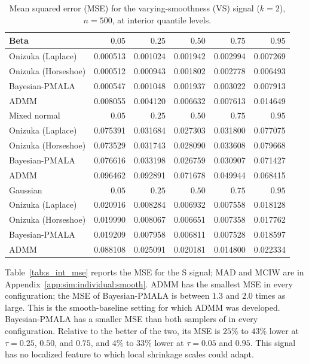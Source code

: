 \begin{table}[!htbp]
\centering
\small
\caption{Mean squared error (MSE) for the varying-smoothness (VS) signal ($k=2$), $n=500$, at interior quantile levels.}
\label{tab:vs_int_mse}
\begin{tabular}{lrrrrr}
\toprule
Beta & $0.05$ & $0.25$ & $0.50$ & $0.75$ & $0.95$ \\
\midrule
Onizuka (Laplace) & 0.000513 & 0.001024 & 0.001942 & 0.002994 & 0.007269 \\
Onizuka (Horseshoe) & 0.000512 & 0.000943 & 0.001802 & 0.002778 & 0.006493 \\
Bayesian-PMALA & 0.000547 & 0.001048 & 0.001937 & 0.003022 & 0.007913 \\
ADMM & 0.008055 & 0.004120 & 0.006632 & 0.007613 & 0.014649 \\
\midrule
Mixed normal & $0.05$ & $0.25$ & $0.50$ & $0.75$ & $0.95$ \\
\midrule
Onizuka (Laplace) & 0.075391 & 0.031684 & 0.027303 & 0.031800 & 0.077075 \\
Onizuka (Horseshoe) & 0.073529 & 0.031743 & 0.028090 & 0.033608 & 0.079668 \\
Bayesian-PMALA & 0.076616 & 0.033198 & 0.026759 & 0.030907 & 0.071427 \\
ADMM & 0.096462 & 0.092891 & 0.071678 & 0.049944 & 0.068415 \\
\midrule
Gaussian & $0.05$ & $0.25$ & $0.50$ & $0.75$ & $0.95$ \\
\midrule
Onizuka (Laplace) & 0.020916 & 0.008284 & 0.006932 & 0.007558 & 0.018128 \\
Onizuka (Horseshoe) & 0.019990 & 0.008067 & 0.006651 & 0.007358 & 0.017762 \\
Bayesian-PMALA & 0.019209 & 0.007958 & 0.006811 & 0.007528 & 0.018597 \\
ADMM & 0.088108 & 0.025091 & 0.020181 & 0.014800 & 0.022334 \\
\bottomrule
\end{tabular}
\end{table}

Table~\ref{tab:s_int_mse} reports the MSE for the S signal; MAD and MCIW are in Appendix~\ref{app:sim:individual:smooth}. ADMM has the smallest MSE in every configuration; the MSE of Bayesian-PMALA is between $1.3$ and $2.0$ times as large. This is the smooth-baseline setting for which ADMM was developed. Bayesian-PMALA has a smaller MSE than both samplers of \citet{onizuka2024fast} in every configuration. Relative to the better of the two, its MSE is $25\%$ to $43\%$ lower at $\tau=0.25$, $0.50$, and $0.75$, and $4\%$ to $33\%$ lower at $\tau=0.05$ and $0.95$. This signal has no localized feature to which local shrinkage scales could adapt.

